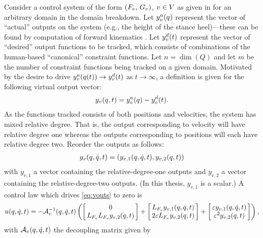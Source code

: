 Consider a control system of the form $(F_{v}, \, G_{v})$, $v \in V$ as given in
 for an arbitrary domain in the domain breakdown.
%
Let $y^{a}_{v}(q)$ represent the vector of ``actual'' outputs on the system
(e.g., the height of the stance heel)---these can be found by computation of
forward kinematics \cite{Murray1994}.
%
Let $y^{d}_{v}(t)$ represent the vector of ``desired'' output functions to be
tracked, which consists of combinations of the human-based ``canonical''
constraint functions.
%
Let $n = \dim(Q)$ and let $m$ be the number of constraint functions being
tracked on a given domain.
%
Motivated by the desire to drive $y^{a}_{v}(q(t)) \to y^{d}_{v}(t)$ as $t
\to \infty$, a definition is given for the following virtual output vector:
%
\begin{align}
  \label{eq:virtout}
  y_v(q, t) = y^a_v(q) - y^d_v(t).
\end{align}
As the functions tracked consists of both positions and velocities, the system
has mixed relative degree.
%
That is, the output corresponding to velocity will have relative degree one
whereas the outputs corresponding to positions will each have relative degree
two.
%
Reorder the outputs as follows:
\begin{align}
  \label{eq:vouts}
  y_v(q, \dot{q}, t) = (y_{v,1}(q, \dot{q}, t), y_{v,2}(q, t))
\end{align}
with $y_{v,1}$ a vector containing the relative-degree-one outputs and $y_{v,2}$
a vector containing the relative-degree-two outputs.
%
(In this thesis, $y_{v,1}$ is a scalar.)
%
A control law which drives \eqref{eq:vouts} to zero is
\begin{align*}
  u(\q, \dq, t) = -\mathcal{A}_{v}^{-1}(\q, \dq, t)
  \left(\left[\!\!\begin{array}{c}
      0\\
      L_{\xfv} L_{\xfv} y_{v,2}(\q, t)
    \end{array}\!\!\right]
  + \left[\!\!\begin{array}{c}
      L_{\xfv} y_{v,1}(\q, \dq, t)\\
      2 \varepsilon L_{\xfv} y_{v,2}(\q, t)
    \end{array}\!\!\right] +
  \left[\!\!\begin{array}{c}
      \varepsilon y_{v,1}(\q, \dq, t)\\
      \varepsilon^2 y_{v,2}(\q, t)
    \end{array}\!\!\right]\right),
\end{align*}
with $\mathcal{A}_{v}(q, \dot{q}, t)$ the decoupling matrix given by

